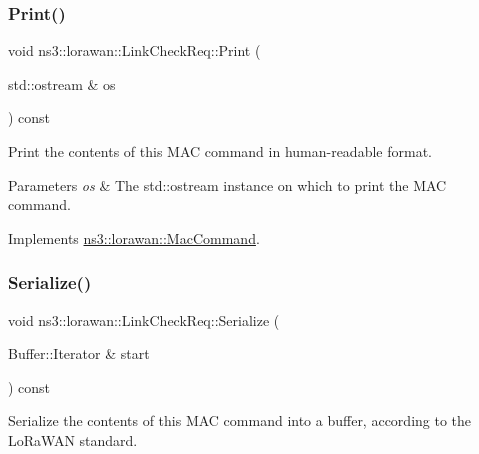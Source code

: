 \mbox{\label{classns3_1_1lorawan_1_1LinkCheckReq_aa3a4fd54a54699ca3ec15ce608008fc3}} 
\subsubsection{\texorpdfstring{Print()}{Print()}}
{\footnotesize\ttfamily void ns3\+::lorawan\+::\+Link\+Check\+Req\+::\+Print (\begin{DoxyParamCaption}\item[{std\+::ostream \&}]{os }\end{DoxyParamCaption}) const\hspace{0.3cm}{\ttfamily [virtual]}}

Print the contents of this M\+AC command in human-\/readable format.


\begin{DoxyParams}{Parameters}
{\em os} & The std\+::ostream instance on which to print the M\+AC command. \\
\hline
\end{DoxyParams}


Implements \hyperlink{classns3_1_1lorawan_1_1MacCommand_a6bf88db38dab7dcd817811a9fb59f920}{ns3\+::lorawan\+::\+Mac\+Command}.

\mbox{\label{classns3_1_1lorawan_1_1LinkCheckReq_a1be81dab18f22e357719385bb1f9fc46}} 
\subsubsection{\texorpdfstring{Serialize()}{Serialize()}}
{\footnotesize\ttfamily void ns3\+::lorawan\+::\+Link\+Check\+Req\+::\+Serialize (\begin{DoxyParamCaption}\item[{Buffer\+::\+Iterator \&}]{start }\end{DoxyParamCaption}) const\hspace{0.3cm}{\ttfamily [virtual]}}

Serialize the contents of this M\+AC command into a buffer, according to the Lo\+Ra\+W\+AN standard.


